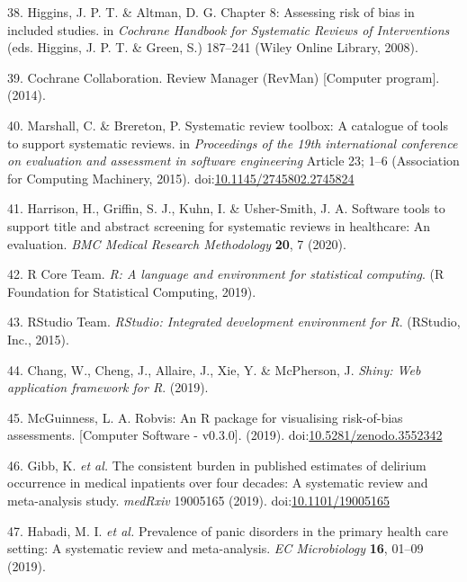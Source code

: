 \documentclass[a4paper, twoside]{templates/ociamthesis}
\begin{document}
\leavevmode\hypertarget{ref-higgins2008assessing}{}%
38. Higgins, J. P. T. \& Altman, D. G. Chapter 8: Assessing risk of bias in included studies. in \emph{Cochrane Handbook for Systematic Reviews of Interventions} (eds. Higgins, J. P. T. \& Green, S.) 187--241 (Wiley Online Library, 2008).

\leavevmode\hypertarget{ref-cochrane2014review}{}%
39. Cochrane Collaboration. Review Manager (RevMan) {[}Computer program{]}. (2014).

\leavevmode\hypertarget{ref-marshall2015systematic}{}%
40. Marshall, C. \& Brereton, P. Systematic review toolbox: A catalogue of tools to support systematic reviews. in \emph{Proceedings of the 19th international conference on evaluation and assessment in software engineering} Article 23; 1--6 (Association for Computing Machinery, 2015). doi:\href{https://doi.org/10.1145/2745802.2745824}{10.1145/2745802.2745824}

\leavevmode\hypertarget{ref-harrison2020software}{}%
41. Harrison, H., Griffin, S. J., Kuhn, I. \& Usher-Smith, J. A. Software tools to support title and abstract screening for systematic reviews in healthcare: An evaluation. \emph{BMC Medical Research Methodology} \textbf{20}, 7 (2020).

\leavevmode\hypertarget{ref-rref}{}%
42. R Core Team. \emph{R: A language and environment for statistical computing}. (R Foundation for Statistical Computing, 2019).

\leavevmode\hypertarget{ref-rstudioref}{}%
43. RStudio Team. \emph{RStudio: Integrated development environment for R}. (RStudio, Inc., 2015).

\leavevmode\hypertarget{ref-shinyref}{}%
44. Chang, W., Cheng, J., Allaire, J., Xie, Y. \& McPherson, J. \emph{Shiny: Web application framework for R}. (2019).

\leavevmode\hypertarget{ref-mcguinness2019a}{}%
45. McGuinness, L. A. Robvis: An R package for visualising risk-of-bias assessments. {[}Computer Software - v0.3.0{]}. (2019). doi:\href{https://doi.org/10.5281/zenodo.3552342}{10.5281/zenodo.3552342}

\leavevmode\hypertarget{ref-gibb2019consistent}{}%
46. Gibb, K. \emph{et al.} The consistent burden in published estimates of delirium occurrence in medical inpatients over four decades: A systematic review and meta-analysis study. \emph{medRxiv} 19005165 (2019). doi:\href{https://doi.org/10.1101/19005165}{10.1101/19005165}

\leavevmode\hypertarget{ref-habadi2019prevalence}{}%
47. Habadi, M. I. \emph{et al.} Prevalence of panic disorders in the primary health care setting: A systematic review and meta-analysis. \emph{EC Microbiology} \textbf{16}, 01--09 (2019).
\end{document}

